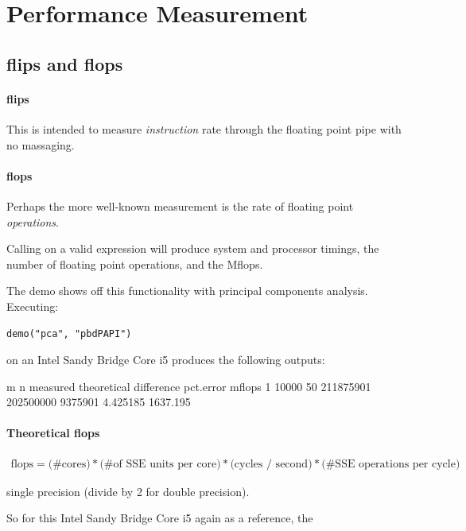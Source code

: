 \section{Performance Measurement}


\subsection{flips and flops}

\paragraph{flips}  This is intended to measure \emph{instruction} rate through the floating point pipe with no massaging.



\paragraph{flops}  Perhaps the more well-known measurement is the rate of floating point \emph{operations}.  

Calling  on a valid \R expression  will produce system and processor timings, the number of floating point operations, and the Mflops.

The  demo shows off this functionality with principal components analysis.  Executing:
\begin{lstlisting}
demo("pca", "pbdPAPI")
\end{lstlisting}
on an Intel Sandy Bridge Core i5 produces the following outputs:
\begin{Output}
      m  n  measured theoretical difference pct.error   mflops
1 10000 50 211875901   202500000    9375901  4.425185 1637.195
\end{Output}



\paragraph{Theoretical flops}
\begin{align*}
\text{flops} = \text{(\# cores)} * \text{(\# of SSE units per core)} * \text{(cycles / second)} * \text{(\# SSE operations per cycle)}
\end{align*}

single precision (divide by 2 for double precision).

So for this Intel Sandy Bridge Core i5 again as a reference, the 

